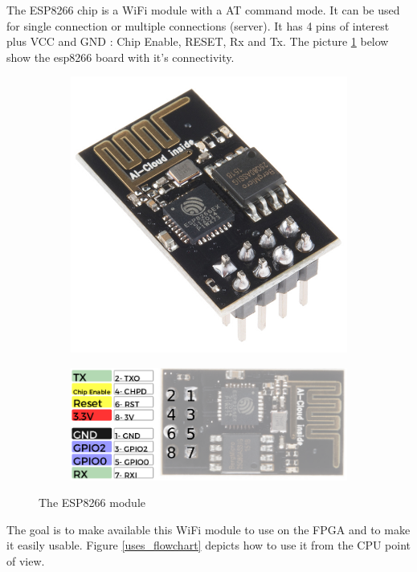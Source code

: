 \documentclass[11pt]{article}
\begin{document}
The ESP8266 chip is a WiFi module with a AT command mode. It can be used for 
single connection or multiple connections (server).
It has 4 pins of interest plus VCC and GND : Chip Enable, RESET, Rx and Tx. The picture \ref{esp8266} below show the esp8266 board with it's connectivity.
\begin{figure}[H]
\centering
\begin{subfigure}{.7\textwidth}
  \centering
  \includegraphics[width=.7\linewidth]{ESP8266.jpg}
\end{subfigure}%

\begin{subfigure}{.9\textwidth}
  \centering
  \includegraphics[width=.9\linewidth]{ESP8266_pinout.png}
\end{subfigure}
\caption{The ESP8266 module}
\label{esp8266}
\end{figure}

The goal is to make available this WiFi module to use on the FPGA and to make it easily usable. Figure \ref{uses_flowchart} depicts how to use it from the CPU point of view.
\end{document}
